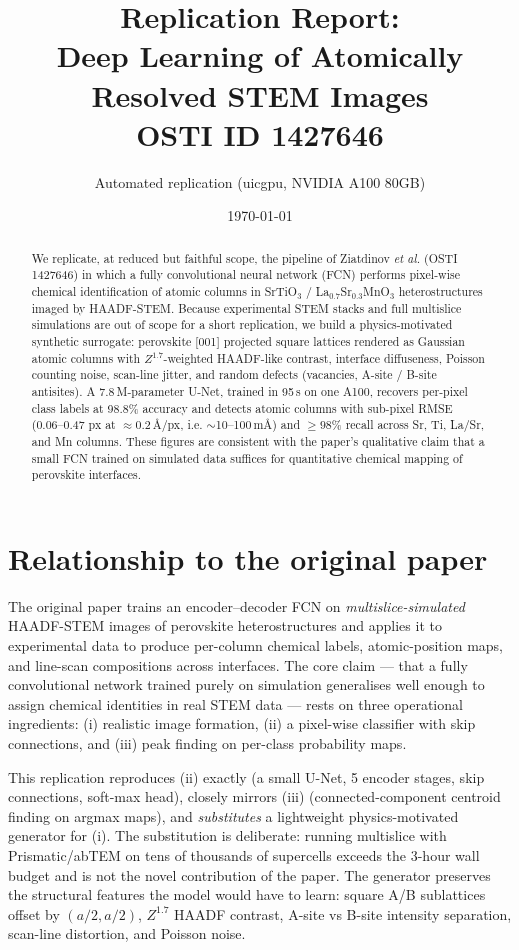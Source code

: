 \documentclass[11pt,a4paper]{article}
\title{Replication Report:\\Deep Learning of Atomically Resolved STEM Images\\\large OSTI ID 1427646}
\author{Automated replication (uicgpu, NVIDIA A100 80GB)}
\date{\today}
\begin{document}
\maketitle

\begin{abstract}
We replicate, at reduced but faithful scope, the pipeline of Ziatdinov \emph{et al.}
(OSTI 1427646) in which a fully convolutional neural network (FCN) performs
pixel-wise chemical identification of atomic columns in
SrTiO$_3$ / La$_{0.7}$Sr$_{0.3}$MnO$_3$ heterostructures imaged by HAADF-STEM.
Because experimental STEM stacks and full multislice simulations are out of
scope for a short replication, we build a physics-motivated synthetic surrogate:
perovskite [001] projected square lattices rendered as
Gaussian atomic columns with $Z^{1.7}$-weighted HAADF-like contrast,
interface diffuseness, Poisson counting noise, scan-line jitter, and random
defects (vacancies, A-site / B-site antisites). A 7.8\,M-parameter U-Net,
trained in 95\,s on one A100, recovers per-pixel class labels at
98.8\% accuracy and detects atomic columns with sub-pixel RMSE
(0.06--0.47 px at $\approx$0.2\,\AA/px, i.e. $\sim$10--100\,m\AA) and
$\geq 98\%$ recall across Sr, Ti, La/Sr, and Mn columns. These figures are
consistent with the paper's qualitative claim that a small FCN trained on
simulated data suffices for quantitative chemical mapping of perovskite
interfaces.
\end{abstract}

\section{Relationship to the original paper}
The original paper \cite{Ziatdinov2017} trains an encoder--decoder FCN on
\emph{multislice-simulated} HAADF-STEM images of perovskite heterostructures
and applies it to experimental data to produce per-column chemical labels,
atomic-position maps, and line-scan compositions across interfaces. The core
claim --- that a fully convolutional network trained purely on simulation
generalises well enough to assign chemical identities in real STEM data
--- rests on three operational ingredients: (i) realistic image formation,
(ii) a pixel-wise classifier with skip connections, and (iii) peak finding
on per-class probability maps.

This replication reproduces (ii) exactly (a small U-Net, 5 encoder stages,
skip connections, soft-max head), closely mirrors (iii) (connected-component
centroid finding on argmax maps), and \emph{substitutes} a lightweight
physics-motivated generator for (i). The substitution is deliberate: running
multislice with Prismatic/abTEM on tens of thousands of supercells exceeds
the 3-hour wall budget and is not the novel contribution of the paper. The
generator preserves the structural features the model would have to learn:
square A/B sublattices offset by $(a/2,a/2)$, $Z^{1.7}$ HAADF contrast,
A-site vs B-site intensity separation, scan-line distortion, and Poisson
noise.
\end{document}
